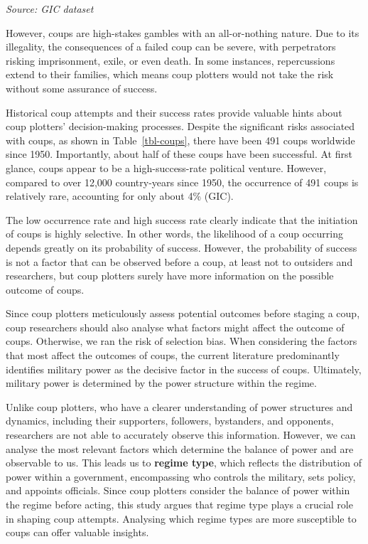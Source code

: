 \documentclass[
  12pt,
]{report}
\begin{document}
\begin{minipage}{\linewidth}
\emph{Source: GIC dataset}\\
\end{minipage}
\endgroup

However, coups are high-stakes gambles with an all-or-nothing nature.
Due to its illegality, the consequences of a failed coup can be severe,
with perpetrators risking imprisonment, exile, or even death. In some
instances, repercussions extend to their families, which means coup
plotters would not take the risk without some assurance of success.

Historical coup attempts and their success rates provide valuable hints
about coup plotters' decision-making processes. Despite the significant
risks associated with coups, as shown in Table~\ref{tbl-coups}, there
have been 491 coups worldwide since 1950. Importantly, about half of
these coups have been successful. At first glance, coups appear to be a
high-success-rate political venture. However, compared to over 12,000
country-years since 1950, the occurrence of 491 coups is relatively
rare, accounting for only about 4\% (GIC).

The low occurrence rate and high success rate clearly indicate that the
initiation of coups is highly selective. In other words, the likelihood
of a coup occurring depends greatly on its probability of success.
However, the probability of success is not a factor that can be observed
before a coup, at least not to outsiders and researchers, but coup
plotters surely have more information on the possible outcome of coups.

Since coup plotters meticulously assess potential outcomes before
staging a coup, coup researchers should also analyse what factors might
affect the outcome of coups. Otherwise, we ran the risk of selection
bias. When considering the factors that most affect the outcomes of
coups, the current literature predominantly identifies military power as
the decisive factor in the success of coups. Ultimately, military power
is determined by the power structure within the regime.

Unlike coup plotters, who have a clearer understanding of power
structures and dynamics, including their supporters, followers,
bystanders, and opponents, researchers are not able to accurately
observe this information. However, we can analyse the most relevant
factors which determine the balance of power and are observable to us.
This leads us to \textbf{regime type}, which reflects the distribution
of power within a government, encompassing who controls the military,
sets policy, and appoints officials. Since coup plotters consider the
balance of power within the regime before acting, this study argues that
regime type plays a crucial role in shaping coup attempts. Analysing
which regime types are more susceptible to coups can offer valuable
insights.
\end{document}
